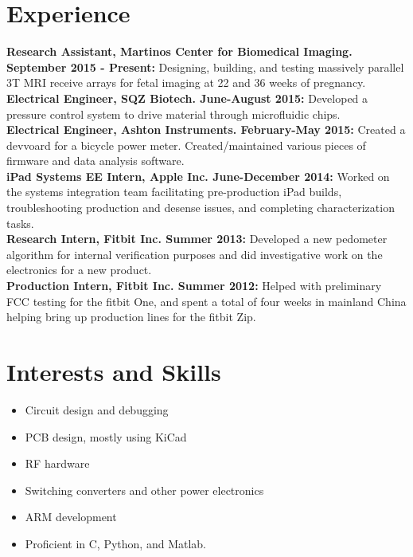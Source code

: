 \documentclass{res}
\begin{document}
\begin{resume}
\section{Experience}
	\vspace{0.05in}
	
	{\bf Research Assistant, Martinos Center for Biomedical Imaging. September 2015 - Present:} Designing, building, and testing massively parallel 3T MRI receive arrays for fetal imaging at 22 and 36 weeks of pregnancy. \vspace{0.05in}\\
	{\bf Electrical Engineer, SQZ Biotech. June-August 2015:} Developed a pressure control system to drive material through microfluidic chips. \vspace{0.05in}\\
	{\bf Electrical Engineer, Ashton Instruments. February-May 2015:} Created a devvoard for a bicycle power meter.  Created/maintained various pieces of firmware and data analysis software. \vspace{0.05in}\\
	{\bf iPad Systems EE Intern, Apple Inc. June-December 2014:} Worked on the systems integration team facilitating pre-production iPad builds, troubleshooting production and desense issues, and completing characterization tasks.\vspace{0.05in}\\
	{\bf Research Intern, Fitbit Inc. Summer 2013:} Developed a new pedometer algorithm for internal verification purposes and did investigative work on the electronics for a new product.\vspace{0.05in}\\
	{\bf Production Intern, Fitbit Inc. Summer 2012:} Helped with preliminary FCC testing for the fitbit One, and spent a total of four weeks in mainland China helping bring up production lines for the fitbit Zip.\\
\section{Interests and Skills}
\begin{itemize}

  \item Circuit design and debugging
  \item PCB design, mostly using KiCad
  \item RF hardware
  \item Switching converters and other power electronics
  \item ARM development
  \item Proficient in C, Python, and Matlab.
\end{itemize}

\end{resume}
\end{document}
